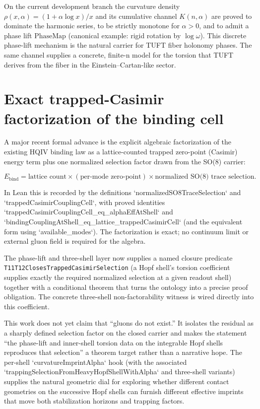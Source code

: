 \documentclass[11pt]{article}
\newcommand{\leanid}[1]{\nolinkurl{#1}}
\begin{document}
On the current development branch the curvature density
$\rho(x,\alpha)=(1+\alpha\log x)/x$ and its cumulative channel $K(n,\alpha)$
are proved to dominate the harmonic series, to be strictly monotone for
$\alpha>0$, and to admit a phase lift $\mathrm{PhaseMap}$ (canonical
example: rigid rotation by $\log\omega$). This discrete phase-lift
mechanism is the natural carrier for TUFT fiber holonomy phases. The
same channel supplies a concrete, finite-n model for the torsion that TUFT
derives from the fiber in the Einstein--Cartan-like sector.

\section{Exact trapped-Casimir factorization of the binding cell}

A major recent formal advance is the explicit algebraic factorization of
the existing HQIV binding law as a lattice-counted trapped zero-point
(Casimir) energy term plus one normalized selection factor drawn from the
SO(8) carrier:

\[
E_{\mathrm{bind}} = \text{lattice count} \times
(\text{per-mode zero-point}) \times
\text{normalized SO(8) trace selection}.
\]

In Lean this is recorded by the definitions
`normalizedSO8TraceSelection` and `trappedCasimirCouplingCell`, with
proved identities
`trappedCasimirCouplingCell_eq_alphaEffAtShell` and
`bindingCouplingAtShell_eq_lattice_trappedCasimirCell`
(and the equivalent form using `available_modes`). The factorization is
exact; no continuum limit or external gluon field is required for the
algebra.

The phase-lift and three-shell layer now supplies a named closure predicate
\leanid{T11T12ClosesTrappedCasimirSelection} (a Hopf shell's torsion coefficient
supplies exactly the required normalized selection at a given readout
shell) together with a conditional theorem that turns the ontology into a
precise proof obligation. The concrete three-shell non-factorability witness is
wired directly into this coefficient.

This work does not yet claim that ``gluons do not exist.'' It isolates the
residual as a sharply defined selection factor on the closed carrier and
makes the statement ``the phase-lift and inner-shell torsion data on the integrable Hopf
shells reproduces that selection'' a theorem target rather than a
narrative hope. The per-shell `curvatureImprintAlpha` hook (with the
associated `trappingSelectionFromHeavyHopfShellWithAlpha` and three-shell
variants) supplies the natural geometric dial for exploring whether
different contact geometries on the successive Hopf shells can furnish
different effective imprints that move both stabilization horizons and
trapping factors.
\end{document}
